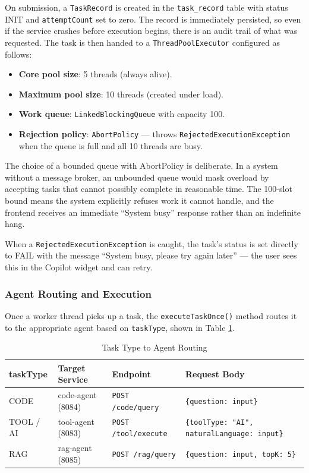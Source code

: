 On submission, a \texttt{TaskRecord} is created in the \texttt{task\_record} table with status INIT and \texttt{attemptCount} set to zero. The record is immediately persisted, so even if the service crashes before execution begins, there is an audit trail of what was requested. The task is then handed to a \texttt{ThreadPoolExecutor} configured as follows:

\begin{itemize}
  \item \textbf{Core pool size}: 5 threads (always alive).
  \item \textbf{Maximum pool size}: 10 threads (created under load).
  \item \textbf{Work queue}: \texttt{LinkedBlockingQueue} with capacity 100.
  \item \textbf{Rejection policy}: \texttt{AbortPolicy} --- throws \texttt{RejectedExecutionException} when the queue is full and all 10 threads are busy.
\end{itemize}

The choice of a bounded queue with AbortPolicy is deliberate. In a system without a message broker, an unbounded queue would mask overload by accepting tasks that cannot possibly complete in reasonable time. The 100-slot bound means the system explicitly refuses work it cannot handle, and the frontend receives an immediate ``System busy'' response rather than an indefinite hang.

When a \texttt{RejectedExecutionException} is caught, the task's status is set directly to FAIL with the message ``System busy, please try again later'' --- the user sees this in the Copilot widget and can retry.

\subsubsection{Agent Routing and Execution}

Once a worker thread picks up a task, the \texttt{executeTaskOnce()} method routes it to the appropriate agent based on \texttt{taskType}, shown in Table \ref{tab:task-routing}.

\begin{table}[H]
\small\singlespacing
\centering
\caption{Task Type to Agent Routing}
\label{tab:task-routing}
\begin{tabularx}{\textwidth}{>{\RaggedRight\arraybackslash}p{}>{\RaggedRight\arraybackslash}p{}>{\RaggedRight\arraybackslash}p{}>{\RaggedRight\arraybackslash}X}
\toprule
\textbf{taskType} & \textbf{Target Service} & \textbf{Endpoint} & \textbf{Request Body} \\
\midrule
CODE & code-agent (8084) & \texttt{POST /code/query} & \texttt{\{question: input\}} \\
TOOL / AI & tool-agent (8083) & \texttt{POST /tool/execute} & \texttt{\{toolType: "AI", naturalLanguage: input\}} \\
RAG & rag-agent (8085) & \texttt{POST /rag/query} & \texttt{\{question: input, topK: 5\}} \\
\bottomrule
\end{tabularx}
\end{table}

